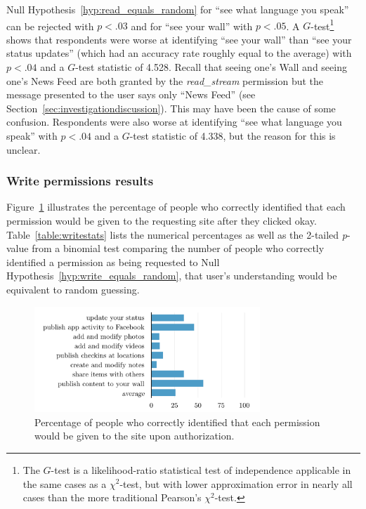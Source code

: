 \documentclass{sig-alternate}
\begin{document}
Null Hypothesis~\ref{hyp:read_equals_random} for ``see what language you speak'' can be rejected with $p < .03$ and for ``see your wall'' with $p < .05$. A $G$-test\footnote{The $G$-test is a likelihood-ratio statistical test of independence applicable in the same cases as a $\chi^2$-test, but with lower approximation error in nearly all cases than the more traditional Pearson's $\chi^2$-test.} shows that respondents were worse at identifying ``see your wall'' than ``see your status updates'' (which had an accuracy rate roughly equal to the average) with $p < .04$ and a $G$-test statistic of 4.528. Recall that seeing one's Wall and seeing one's News Feed are both granted by the \emph{read\_stream} permission but the message presented to the user says only ``News Feed'' (see Section~\ref{sec:investigationdiscussion}). This may have been the cause of some confusion. Respondents were also worse at identifying ``see what language you speak'' with $p < .04$ and a $G$-test statistic of 4.338, but the reason for this is unclear.

\subsubsection{Write permissions results}

Figure~\ref{figure:writepercents} illustrates the percentage of people who correctly identified that each permission would be given to the requesting site after they clicked okay. Table~\ref{table:writestats} lists the numerical percentages as well as the 2-tailed \emph{p}-value from a binomial test comparing the number of people who correctly identified a permission as being requested to Null Hypothesis~\ref{hyp:write_equals_random}, that user's understanding would be equivalent to random guessing.

\begin{figure}[tb!]
  \centering
  \includegraphics[width=8.5cm]{write_percents_cosn}
  \caption{Percentage of people who correctly identified that each permission would be given to the site upon authorization.}
  \label{figure:writepercents}
\end{figure}
\end{document}
